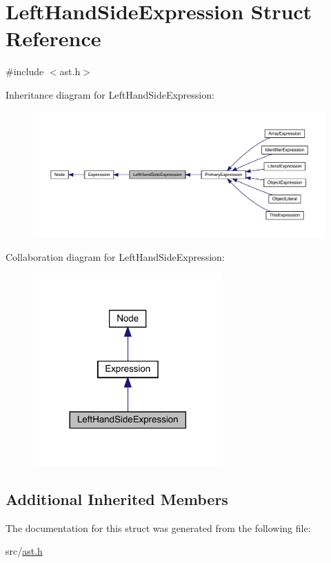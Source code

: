 \hypertarget{struct_left_hand_side_expression}{}\section{Left\+Hand\+Side\+Expression Struct Reference}
\label{struct_left_hand_side_expression}


{\ttfamily \#include $<$ast.\+h$>$}



Inheritance diagram for Left\+Hand\+Side\+Expression\+:\nopagebreak
\begin{figure}[H]
\begin{center}
\leavevmode
\includegraphics[width=350pt]{struct_left_hand_side_expression__inherit__graph}
\end{center}
\end{figure}


Collaboration diagram for Left\+Hand\+Side\+Expression\+:\nopagebreak
\begin{figure}[H]
\begin{center}
\leavevmode
\includegraphics[width=206pt]{struct_left_hand_side_expression__coll__graph}
\end{center}
\end{figure}
\subsection*{Additional Inherited Members}


The documentation for this struct was generated from the following file\+:\begin{DoxyCompactItemize}
\item 
src/\hyperlink{ast_8h}{ast.\+h}\end{DoxyCompactItemize}
